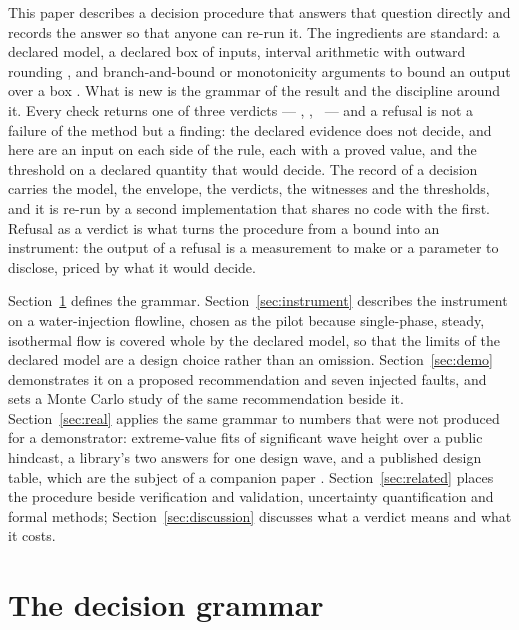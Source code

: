 \documentclass[preprint,11pt,authoryear]{elsarticle}
\begin{document}
This paper describes a decision procedure that answers that question directly and records the answer so that anyone can re-run it. The ingredients are standard: a declared model, a declared box of inputs, interval arithmetic with outward rounding \citep{moore2009}, and branch-and-bound or monotonicity arguments to bound an output over a box \citep{hansen2004,jaulin2001,rump2010}. What is new is the grammar of the result and the discipline around it. Every check returns one of three verdicts --- \vProved, \vRefuted, \vRefused\ --- and a refusal is not a failure of the method but a finding: the declared evidence does not decide, and here are an input on each side of the rule, each with a proved value, and the threshold on a declared quantity that would decide. The record of a decision carries the model, the envelope, the verdicts, the witnesses and the thresholds, and it is re-run by a second implementation that shares no code with the first. Refusal as a verdict is what turns the procedure from a bound into an instrument: the output of a refusal is a measurement to make or a parameter to disclose, priced by what it would decide.

Section~\ref{sec:grammar} defines the grammar. Section~\ref{sec:instrument} describes the instrument on a water-injection flowline, chosen as the pilot because single-phase, steady, isothermal flow is covered whole by the declared model, so that the limits of the declared model are a design choice rather than an omission. Section~\ref{sec:demo} demonstrates it on a proposed recommendation and seven injected faults, and sets a Monte Carlo study of the same recommendation beside it. Section~\ref{sec:real} applies the same grammar to numbers that were not produced for a demonstrator: extreme-value fits of significant wave height over a public hindcast, a library's two answers for one design wave, and a published design table, which are the subject of a companion paper \citep{toledo2026p1}. Section~\ref{sec:related} places the procedure beside verification and validation, uncertainty quantification and formal methods; Section~\ref{sec:discussion} discusses what a verdict means and what it costs.

\section{The decision grammar}\label{sec:grammar}
\end{document}
